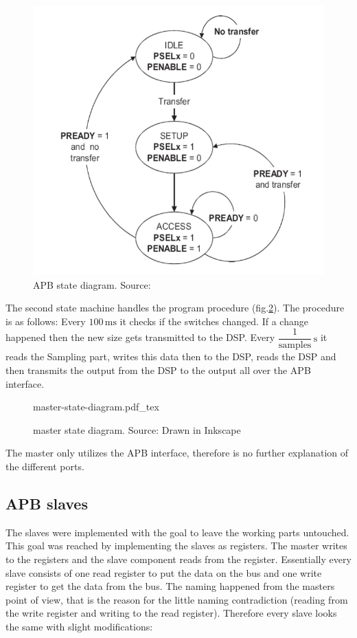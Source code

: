 \documentclass[%
	a4paper,
]
{article}
\newcommand{\incfig}[2]{%
    \def\svgscale{#2}
    {#1.pdf_tex}
}
\begin{document}
\begin{figure}[ht]
    \centering
    \includegraphics[scale=0.3]{fig/apb-state-diag.png}
    \caption{APB state diagram. Source:\protect\autocite{apb}}
    \label{fig:apb-state}
\end{figure}

The second state machine handles the program procedure (fig.\ref{fig:mst-state}). The 
procedure is as follows: Every $100\,\text{ms}$ it checks if
the switches changed. If a change happened then the new size
gets transmitted to the DSP. Every 
$\dfrac{1}{\text{samples}}\,\text{s}$ it reads the
Sampling part, writes this data then to the DSP, reads the DSP
and then transmits the output from the DSP to the output all over the APB interface.

\begin{figure}[ht]
    \centering
    \incfig{master-state-diagram}{1.7}
    \caption{master state diagram. Source: Drawn in Inkscape}
    \label{fig:mst-state}
\end{figure}

The master only utilizes the APB interface, therefore is no further
explanation of the different ports.

\subsection{APB slaves}
The slaves were implemented with the goal to leave the working
parts untouched. This goal was reached by implementing the
slaves as registers. The master writes to the registers and
the slave component reads from the register. Essentially every
slave consists of one read register to put the data on the bus 
and one write register to get the data from the bus. The naming
happened from the masters point of view, that is the reason for the
little naming contradiction (reading from the write register and 
writing to the read register).
Therefore every slave looks the same with slight modifications:
\end{document}
